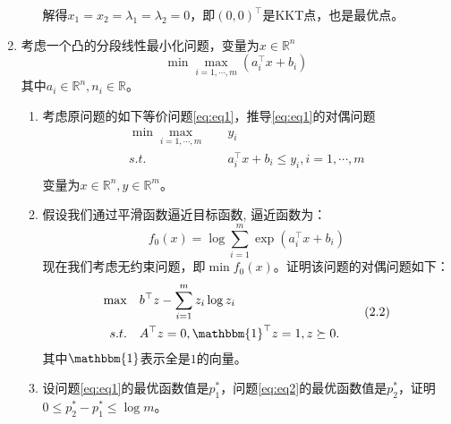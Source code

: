 \documentclass[cn,hazy,cyan,11pt,normal]{elegantnote}
\begin{document}
\begin{enumerate}
\begin{enumerate}
                    \vspace{0.2cm}解得$x_1=x_2=\lambda_1=\lambda_2=0$，即$(0,0)^{\top}$是KKT点，也是最优点。
            \end{enumerate}

        \item \textcolor{c1}{考虑一个凸的分段线性最小化问题，变量为$x\in\mathbb{R}^n$}
            \textcolor{c1}{\[\min\max_{i=1,\cdots,m}(a^{\top}_i x+b_i)\]}
            \textcolor{c1}{其中$a_i\in\mathbb{R}^n,n_i\in\mathbb{R}$。}

            \textcolor{c1}{\begin{enumerate}
                \item 考虑原问题的如下等价问题\ref{eq:eq1}，推导\ref{eq:eq1}的对偶问题
                    \begin{equation}
                        \begin{aligned}
                        \min\max_{i=1,\cdots,m}\quad& y_i\\
                        s.t.\quad& a^{\top}_i x+b_i\leq y_i,i=1,\cdots,m\\
                        \end{aligned}
                        \tag{2.1}
                        \label{eq:eq1}
                    \end{equation}
                    变量为$x\in\mathbb{R}^n,y\in\mathbb{R}^m$。
                \item 假设我们通过平滑函数逼近目标函数, 逼近函数为：
                    \[f_0(x)=\log\sum_{i=1}^m \exp(a_i^{\top}x+b_i)\]
                    现在我们考虑无约束问题，即$\min f_0(x)$。证明该问题的对偶问题如下：
                    \begin{equation}
                        \begin{aligned}
                        \max\quad& b^{\top}z-\sum_{i=1}^m z_i\log z_i\\
                        s.t.\quad& A^{\top}z=0,\mathbbm{1}^{\top}z=1,z\succeq0.\\
                        \end{aligned}
                        \tag{2.2}
                        \label{eq:eq2}
                    \end{equation}
                    其中$\mathbbm{1}$表示全是$1$的向量。
                \item 设问题\ref{eq:eq1}的最优函数值是$p_1^*$，问题\ref{eq:eq2}的最优函数值是$p_2^*$，证明$0\leq p_2^*-p_1^*\leq \log m$。
            \end{enumerate}}


\end{enumerate}
\end{document}
